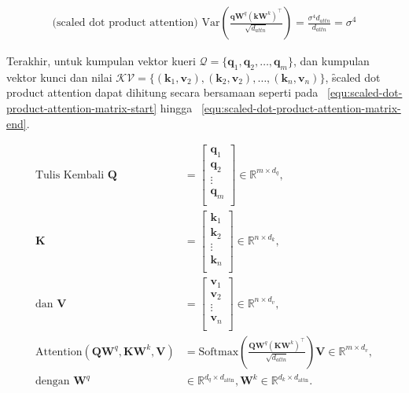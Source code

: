 	\begin{align}
		\label{equ:variance-scaled-dot-product-attention}
		\text{(scaled dot product attention) }\text{Var}\left(\frac{\mathbf{qW}^q (\mathbf{kW}^k)^{\top}}{\sqrt{d_{attn}}}\right) = \frac{\sigma^4 d_{attn}}{d_{attn}} = \sigma^4
	\end{align}

	Terakhir, untuk kumpulan vektor kueri $\mathcal{Q} = \{\mathbf{q}_1, \mathbf{q}_2, \dots, \mathbf{q}_m\}$, dan kumpulan vektor kunci dan nilai $\mathcal{KV} = \{(\mathbf{k}_1, \mathbf{v}_2), (\mathbf{k}_2, \mathbf{v}_2), \dots, (\mathbf{k}_n, \mathbf{v}_n)\}$, \f{scaled dot product attention} dapat dihitung secara bersamaan seperti pada \equ~\ref{equ:scaled-dot-product-attention-matrix-start} hingga \equ~\ref{equ:scaled-dot-product-attention-matrix-end}.

	\begin{align}
	\label{equ:scaled-dot-product-attention-matrix-start}
	\text{Tulis Kembali } \mathbf{Q} &= \begin{bmatrix}
		\mathbf{q}_1 \\
		\mathbf{q}_2 \\
		\vdots \\
		\mathbf{q}_m \\
	\end{bmatrix} \in \mathbb{R}^{m \times d_{q}}, \\
	\mathbf{K} &= \begin{bmatrix}
		\mathbf{k}_1 \\
		\mathbf{k}_2 \\
		\vdots \\
		\mathbf{k}_n \\
	\end{bmatrix} \in \mathbb{R}^{n \times d_{k}}, \\
	\text{dan } \mathbf{V} &= \begin{bmatrix}
		\mathbf{v}_1 \\
		\mathbf{v}_2 \\
		\vdots \\
		\mathbf{v}_n \\
	\end{bmatrix} \in \mathbb{R}^{n \times d_{v}}, \\
	\label{equ:scaled-dot-product-attention-matrix-end}
	\text{Attention}(\mathbf{QW}^q, \mathbf{KW}^k, \mathbf{V}) &= \text{Softmax}( \frac{\mathbf{QW}^q (\mathbf{KW}^k)^{\top}}{\sqrt{d_{attn}}}) \mathbf{V} \in \mathbb{R}^{m \times d_{v}}, \\
	\text{dengan } \mathbf{W}^q &\in \mathbb{R}^{d_q \times d_{\text{attn}}}, \mathbf{W}^k \in \mathbb{R}^{d_k \times d_{\text{attn}}}.
	\end{align}

